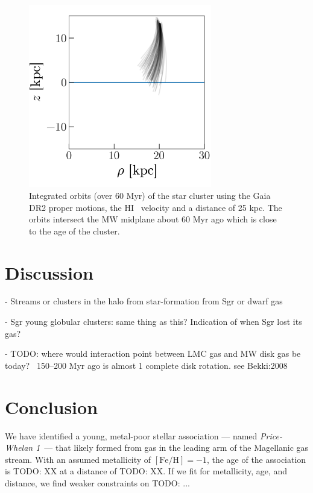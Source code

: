 \documentclass[modern]{aastex62}
\newcommand{\todo}[1]{{\color{red} TODO: #1}}
\newcommand{\feh}{\ensuremath{[\textrm{Fe} / \textrm{H}]}}
\newcommand{\hi}{H{\footnotesize I} }
\newcommand{\clustername}{\textsl{Price-Whelan 1}}
\begin{document}
\begin{figure}
\centering
\includegraphics[width=8cm]{orbits.png}
\caption{Integrated orbits (over 60 Myr) of the star cluster using the Gaia DR2 proper motions, the
\hi~velocity and a distance of 25 kpc.  The orbits intersect the MW midplane about
60 Myr ago which is close to the age of the cluster.}
\label{fig_gass}
\end{figure}

\section{Discussion} \label{sec:discussion}

- Streams or clusters in the halo from star-formation from Sgr or dwarf gas

- Sgr young globular clusters: same thing as this? Indication of when Sgr lost its gas?

- TODO: where would interaction point between LMC gas and MW disk gas be today? ~150–200 Myr ago is almost 1 complete disk rotation. see Bekki:2008

\section{Conclusion} \label{sec:conclusion}

We have identified a young, metal-poor stellar association --- named \clustername\ --- that likely formed from gas in the leading arm of the Magellanic gas stream.
With an assumed metallicity of $\feh = -1$, the age of the association is \todo{XX} at a distance of \todo{XX}.
If we fit for metallicity, age, and distance, we find weaker constraints on \todo{...}



\acknowledgments
\end{document}
